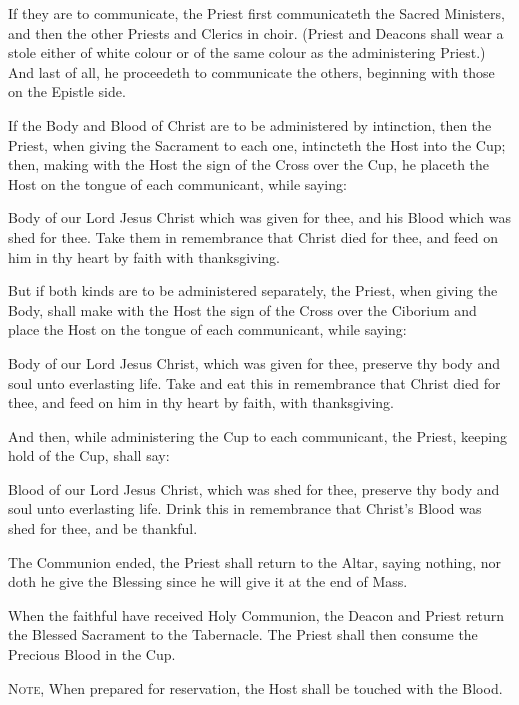 \begin{rubric}
    If they are to communicate, the Priest first communicateth the Sacred Ministers, and then the other Priests and Clerics in choir. (Priest and Deacons shall wear a stole either of white colour or of the same colour as the administering Priest.) And last of all, he proceedeth to communicate the others, beginning with those on the Epistle side.
\end{rubric}
\begin{rubric}
    If the Body and Blood of Christ are to be administered by intinction, then the Priest, when giving the Sacrament to each one, intincteth the Host into the Cup; then, making with the Host the sign of the Cross over the Cup, he placeth the Host on the tongue of each communicant, while saying:
\end{rubric}
 Body of our Lord Jesus Christ which was given for thee, and his Blood which was shed for thee. Take them in remembrance that Christ died for thee, and feed on him in thy heart by faith with thanksgiving.
\begin{rubric}
    But if both kinds are to be administered separately, the Priest, when giving the Body, shall make with the Host the sign of the Cross over the Ciborium and place the Host on the tongue of each communicant, while saying:
\end{rubric}
  Body of our Lord Jesus Christ, which was given for thee, preserve thy body and soul unto everlasting life. Take and eat this in remembrance that Christ died for thee, and feed on him in thy heart by faith, with thanksgiving.
\begin{rubric}
    And then, while administering the Cup to each communicant, the Priest, keeping hold of the Cup, shall say:
\end{rubric}
 Blood of our Lord Jesus Christ, which was shed for thee, preserve thy body and soul unto everlasting life. Drink this in remembrance that Christ's Blood was shed for thee, and be thankful.
\begin{rubric}
    The Communion ended, the Priest shall return to the Altar, saying nothing, nor doth he give the Blessing since he will give it at the end of Mass.    
\end{rubric}
\begin{rubric}
    When the faithful have received Holy Communion, the Deacon and Priest return the Blessed Sacrament to the Tabernacle. The Priest shall then consume the Precious Blood in the Cup.\par
    \textsc{Note,} When prepared for reservation, the Host shall be touched with the Blood.
\end{rubric}
